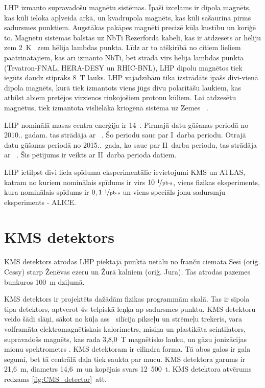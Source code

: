 LHP izmanto supravadošu magnētu sistēmas. Īpaši izceļams ir dipola magnēts, kas kūli ieloka apļveida arkā, un kvadrupola magnēts, kas kūli sašaurina pirms sadursmes punktiem. Augstākas pakāpes magnēti precizē kūļa kustību un koriģē to. Magnētu sistēmas balstās uz NbTi Rezerforda kabeli, kas ir atdzesēts ar hēliju zem 2~K \textendash\ zem hēlija lambdas punkta. Līdz ar to atšķirībā no citiem lieliem paātrinātājiem, kas arī izmanto NbTi, bet strādā virs hēlija lambdas punkta (Tevatron-FNAL, HERA-DESY un RHIC-BNL), LHP dipolu magnētos tiek iegūts daudz stiprāks 8~T lauks. LHP vajadzībām tika izstrādāts īpašs divi-vienā dipola magnēts, kurā tiek izmantots viens jūgs divu polaritāšu laukiem, kas atbilst abiem pretējos virzienos riņķojošiem protonu kūļiem. Lai atdzesētu magnētus, tiek izmantota vislielākā kriogēnā sistēma uz Zemes~\cite{MYERS:2013hra} \cite{Evans:2008zzb}.

LHP nominālā masas centra enerģija ir 14~\TeV. Pirmajā datu gūšanas periodā no 2010.. gadam. tas strādāja ar ~\TeV. Šo periodu sauc par I~\gls{darba periodu}. Otrajā datu gūšanas periodā no 2015..~gada, ko sauc par II~darba periodu, tas strādāja ar ~\TeV. Šis pētījums ir veikts ar II~darba perioda datiem.

LHP ietilpst divi liela spīduma eksperimentālie ievietojumi \textendash KMS un ATLAS, katram no kuriem nominālais spīdums ir virs $10~{\nicefrac{1}{\text{pb}\cdot\text{s}}}$, viens \cPqb fizikas eksperiments, kura nominālais spīdums ir $0,1~\nicefrac{1}{\text{pb}\cdot\text{s}}$ un viens speciāls jonu sadursmju eksperiments - ALICE. 

\section{KMS detektors}

KMS detektors atrodas LHP piektajā punktā netālu no franču ciemata Sesī (oriģ. Cessy) starp Ženēvas ezeru un Žurā kalniem (oriģ. Jura). Tas atrodas pazemes bunkuros 100~m dziļumā. 

KMS detektors ir projektēts dažādām fizikas programmām \TeV skalā. Tas ir sīpola tipa detektors, aptverot $4\pi$ telpiskā leņķa ap sadursmes punktu. KMS detektoru veido šādi slāņi, sākot no kūļa ass \textendash\ silīcija pikseļu un \gls{strēmeļu} trekeris, vara volframāta elektromagnētiskais kalorimetrs, misiņa un plastikāta scintilators, supravadošs magnēts, kas rada 3,8,0~T magnētisko lauku, un gāzu jonizācijas mionu spektrometrs \cite{Chatrchyan:2008aa}. KMS detektoram ir cilindra forma. Tā abos galos ir \gls{gala segumi}, bet tā centrālā daļa tiek saukta par \gls{mucu}. KMS detektora garums ir 21,6~m, diametrs 14,6~m un kopējais svars 12~500~t. KMS detektora atvērums redzams \ref{fig:CMS_detector}~att.

